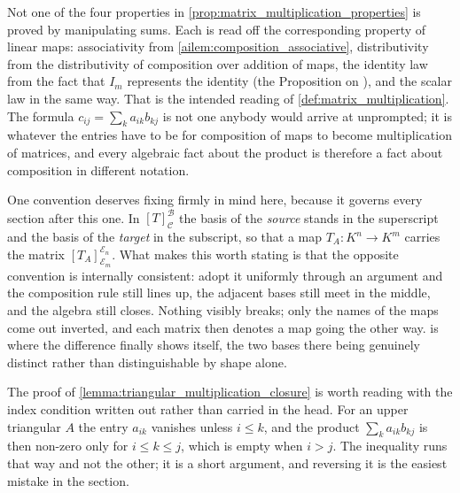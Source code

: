 \begin{ainote}
Not one of the four properties in \cref{prop:matrix_multiplication_properties}
is proved by manipulating sums. Each is read off the corresponding property of
linear maps: associativity from \cref{ailem:composition_associative},
distributivity from the distributivity of composition over addition of maps, the
identity law from the fact that $I_m$ represents the identity (the Proposition
on ), and the scalar law in the same way.
That is the intended reading of \cref{def:matrix_multiplication}. The formula
$c_{ij} = \sum_k a_{ik} b_{kj}$ is not one anybody would arrive at unprompted;
it is whatever the entries have to be for composition of maps to become
multiplication of matrices, and every algebraic fact about the product is
therefore a fact about composition in different notation.

One convention deserves fixing firmly in mind here, because it governs every
section after this one. In $[T]_{\mathcal{C}}^{\mathcal{B}}$ the basis of the
\emph{source} stands in the superscript and the basis of the \emph{target} in
the subscript, so that a map $T_A \colon K^n \to K^m$ carries the matrix
$[T_A]_{\mathcal{E}_m}^{\mathcal{E}_n}$. What makes this worth stating is that
the opposite convention is internally consistent: adopt it uniformly through an
argument and the composition rule still lines up, the adjacent bases still meet
in the middle, and the algebra still closes. Nothing visibly breaks; only the
names of the maps come out inverted, and each matrix then denotes a map going
the other way.  is where the difference finally shows
itself, the two bases there being genuinely distinct rather than
distinguishable by shape alone.

The proof of \cref{lemma:triangular_multiplication_closure} is worth reading
with the index condition written out rather than carried in the head. For an
upper triangular $A$ the entry $a_{ik}$ vanishes unless $i \le k$, and the
product $\sum_k a_{ik} b_{kj}$ is then non-zero only for $i \le k \le j$, which
is empty when $i > j$. The inequality runs that way and not the other; it is a
short argument, and reversing it is the easiest mistake in the section.
\end{ainote}


